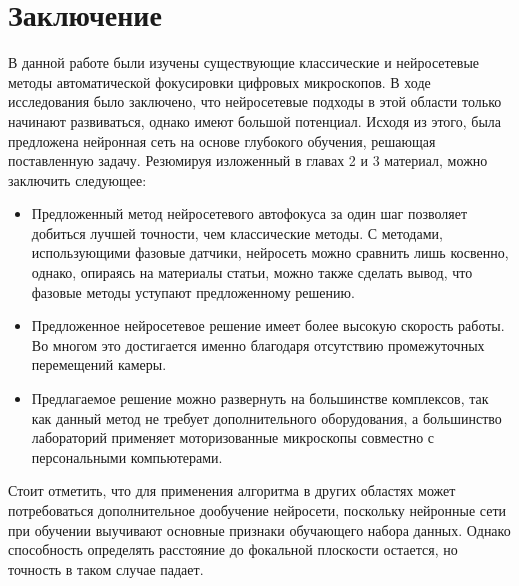 \chapter*{Заключение} \label{ch-conclusion}

В данной работе были изучены существующие классические и нейросетевые методы автоматической фокусировки цифровых микроскопов. В ходе исследования было заключено, что нейросетевые подходы в этой области только начинают развиваться, однако имеют большой потенциал. Исходя из этого, была предложена нейронная сеть на основе глубокого обучения, решающая поставленную задачу. Резюмируя изложенный в главах 2 и 3 материал, можно заключить следующее:
\begin{itemize}
	\item Предложенный метод нейросетевого автофокуса за один шаг позволяет добиться лучшей точности, чем классические методы. С методами, использующими фазовые датчики, нейросеть можно сравнить лишь косвенно, однако, опираясь на материалы статьи, можно также сделать вывод, что фазовые методы уступают предложенному решению.
	
	\item Предложенное нейросетевое решение имеет более высокую скорость работы. Во многом это достигается именно благодаря отсутствию промежуточных перемещений камеры.
	
	
	\item Предлагаемое решение можно развернуть на большинстве комплексов, так как данный метод не требует дополнительного оборудования, а большинство лабораторий применяет моторизованные микроскопы совместно с персональными компьютерами.
\end{itemize}

Стоит отметить, что для применения алгоритма в других областях может потребоваться дополнительное дообучение нейросети, поскольку нейронные сети при обучении выучивают основные признаки обучающего набора данных. Однако способность определять расстояние до фокальной плоскости остается, но точность в таком случае падает.